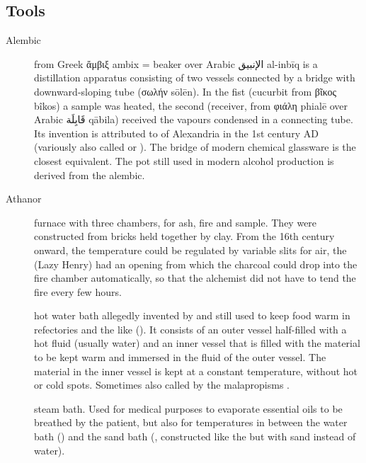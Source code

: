 \documentclass[british,final,landscape]{scrartcl}
\begin{document}
\begin{refsection}
\section{Tools}

\begin{description}
  \item[Alembic]{from Greek \foreignlanguage{greek}{ἄμβιξ} ambix = beaker over Arabic \foreignlanguage{arabic}{الإنبيق} al-inbīq is a distillation apparatus consisting of two vessels connected by a bridge with downward-sloping tube (\foreignlanguage{greek}{σωλήν} sōlēn). In the fist (cucurbit from \foreignlanguage{greek}{βῖκος} bîkos) a sample was heated, the second (receiver, from \foreignlanguage{greek}{φιάλη} phialē over Arabic \foreignlanguage{arabic}{قَابِلَة} qābila) received the vapours condensed in a connecting tube. Its invention is attributed to  of Alexandria in the 1st century AD (variously also called  or ). The bridge of modern chemical glassware is the closest equivalent. The pot still used in modern alcohol production is derived from the alembic. }
  \item[Athanor]{furnace with three chambers, for ash, fire and sample. They were constructed from bricks held together by clay. From the 16th century onward, the temperature could be regulated by variable slits for air, the  (Lazy Henry) had an opening from which the charcoal could drop into the fire chamber automatically, so that the alchemist did not have to tend the fire every few hours. }
  \item[]{hot water bath allegedly invented by  and still used to keep food warm in refectories and the like (). It consists of an outer vessel half-filled with a hot fluid (usually water) and an inner vessel that is filled with the material to be kept warm and immersed in the fluid of the outer vessel. The material in the inner vessel is kept at a constant temperature, without hot or cold spots. Sometimes also called by the malapropisms .}
  \item[]{steam bath. Used for medical purposes to evaporate essential oils to be breathed by the patient, but also for temperatures in between the water bath () and the sand bath (, constructed like the  but with sand instead of water). }

\end{description}
\end{refsection}
\end{document}
